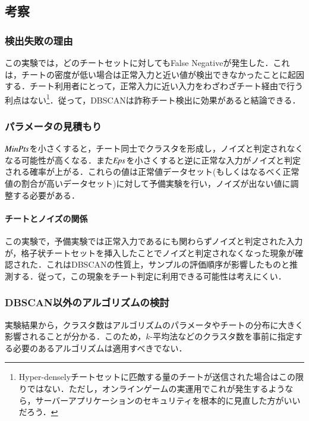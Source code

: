 \subsection{考察}
\subsubsection{検出失敗の理由}
この実験では，どのチートセットに対してもFalse Negativeが発生した．これは，チートの密度が低い場合は正常入力と近い値が検出できなかったことに起因する．チート利用者にとって，正常入力に近い入力をわざわざチート経由で行う利点はない\footnote{Hyper-denselyチートセットに匹敵する量のチートが送信された場合はこの限りではない．ただし，オンラインゲームの実運用でこれが発生するようなら，サーバーアプリケーションのセキュリティを根本的に見直した方がいいだろう．}．従って，DBSCANは詐称チート検出に効果があると結論できる．

\subsubsection{パラメータの見積もり}
${\it MinPts}$を小さくすると，チート同士でクラスタを形成し，ノイズと判定されなくなる可能性が高くなる．また${\it Eps}$を小さくすると逆に正常な入力がノイズと判定される確率が上がる．これらの値は正常値データセット(もしくはなるべく正常値の割合が高いデータセット)に対して予備実験を行い，ノイズが出ない値に調整する必要がある．

\paragraph{チートとノイズの関係}
この実験で，予備実験では正常入力であるにも関わらずノイズと判定された入力が，格子状チートセットを挿入したことでノイズと判定されなくなった現象が確認された．これはDBSCANの性質上，サンプルの評価順序が影響したものと推測する．従って，この現象をチート判定に利用できる可能性は考えにくい．

\subsubsection{DBSCAN以外のアルゴリズムの検討}
実験結果から，クラスタ数はアルゴリズムのパラメータやチートの分布に大きく影響されることが分かる．このため，$k$-平均法\cite{kmean}などのクラスタ数を事前に指定する必要のあるアルゴリズムは適用すべきでない．
